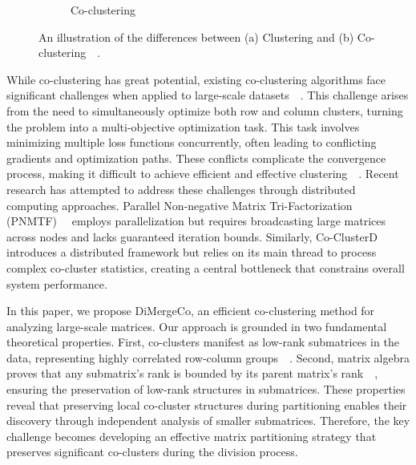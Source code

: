 \documentclass[journal]{IEEEtran}
\renewcommand{\cite}[1]{~\autocite{#1}}
\begin{document}
\begin{figure}[t]
\begin{subfigure}[b]{0.22\textwidth}
        \caption{Co-clustering}
        \label{fig:cocluster}
    \end{subfigure}
    \caption{An illustration of the differences between (a) Clustering and (b) Co-clustering~\cite{yan2017CoclusteringMultidimensionalBig}.}
    \label{fig:cocomparison}
\end{figure}

While co-clustering has great potential, existing co-clustering algorithms face significant challenges when applied to large-scale datasets~\cite{cheng2015CoClusterDDistributedFramework}. This challenge arises from the need to simultaneously optimize both row and column clusters, turning the problem into a multi-objective optimization task. This task involves minimizing multiple loss functions concurrently, often leading to conflicting gradients and optimization paths. These conflicts complicate the convergence process, making it difficult to achieve efficient and effective clustering~\cite{coello2007EvolutionaryAlgorithmsSolving}. Recent research has attempted to address these challenges through distributed computing approaches. Parallel Non-negative Matrix Tri-Factorization (PNMTF)~\cite{chen2023ParallelNonNegativeMatrix} employs parallelization but requires broadcasting large matrices across nodes and lacks guaranteed iteration bounds. Similarly, Co-ClusterD~\cite{cheng2015CoClusterDDistributedFramework} introduces a distributed framework but relies on its main thread to process complex co-cluster statistics, creating a central bottleneck that constrains overall system performance.

In this paper, we propose DiMergeCo, an efficient co-clustering method for analyzing large-scale matrices. Our approach is grounded in two fundamental theoretical properties. First, co-clusters manifest as low-rank submatrices in the data, representing highly correlated row-column groups~\cite{zhao2016IdentifyingMultidimensionalCoclusters}. Second, matrix algebra proves that any submatrix's rank is bounded by its parent matrix's rank~\cite{horn1985MatrixAnalysis}, ensuring the preservation of low-rank structures in submatrices. These properties reveal that preserving local co-cluster structures during partitioning enables their discovery through independent analysis of smaller submatrices. Therefore, the key challenge becomes developing an effective matrix partitioning strategy that preserves significant co-clusters during the division process.
\end{document}
